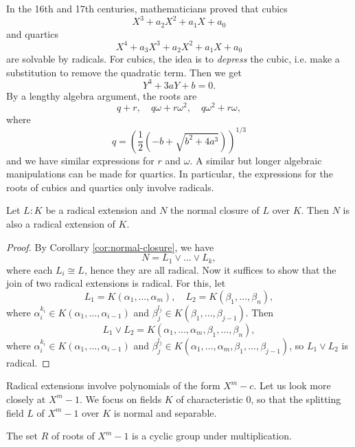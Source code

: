 \begin{remark}
  In the 16th and 17th centuries, mathematicians
  proved that cubics
  \[
    X^3 + a_2 X^2 + a_1 X + a_0
  \]
  and quartics
  \[
    X^4 + a_3 X^3 + a_2 X^2 + a_1 X + a_0
  \]
  are solvable by radicals. For cubics, the idea
  is to \emph{depress} the cubic, i.e. make a substitution
  to remove the quadratic term. Then we get
  \[
    Y^3 + 3aY + b = 0.
  \]
  By a lengthy algebra argument, the roots are
  \[
    q + r, \quad q\omega + r\omega^2, \quad q\omega^2 + r\omega,
  \]
  where
  \[
    q = \left(\frac{1}{2} (-b + \sqrt{b^2 + 4a^3})\right)^{1 / 3}
  \]
  and we have similar expressions for $r$ and $\omega$.
  A similar but longer algebraic manipulations can be
  made for quartics. In particular, the expressions for
  the roots of cubics and quartics only involve radicals.
\end{remark}

\begin{theorem}
  Let $L : K$ be a radical extension and $N$ the
  normal closure of $L$ over $K$. Then $N$ is also
  a radical extension of $K$.
\end{theorem}

\begin{proof}
  By Corollary \ref{cor:normal-closure}, we have
  \[
    N = L_1 \lor \dots \lor L_k,
  \]
  where each $L_i \cong L$, hence they are all radical.
  Now it suffices to show that the join of two radical
  extensions is radical. For this, let
  \[
    L_1 = K(\alpha_1, \dots, \alpha_m), \quad
    L_2 = K(\beta_1, \dots, \beta_n),
  \]
  where $\alpha_i^{k_i} \in K(\alpha_1, \dots, \alpha_{i - 1})$
  and $\beta_j^{l_j} \in K(\beta_1, \dots, \beta_{j - 1})$.
  Then
  \[
    L_1 \lor L_2 = K(\alpha_1, \dots, \alpha_m, \beta_1, \dots, \beta_n),
  \]
  where $\alpha_i^{k_i} \in K(\alpha_1, \dots, \alpha_{i - 1})$ and
  $\beta_j^{l_j} \in K(\alpha_1, \dots, \alpha_m, \beta_1, \dots, \beta_{j - 1})$,
  so $L_1 \lor L_2$ is radical.
\end{proof}

\begin{remark}
  Radical extensions involve polynomials of the form
  $X^m - c$. Let us look more closely at $X^m - 1$.
  We focus on fields $K$ of characteristic $0$, so
  that the splitting field $L$ of $X^m - 1$ over $K$
  is normal and separable.
\end{remark}

\begin{lemma}
  The set $R$ of roots of $X^m - 1$ is a cyclic group
  under multiplication.
\end{lemma}

